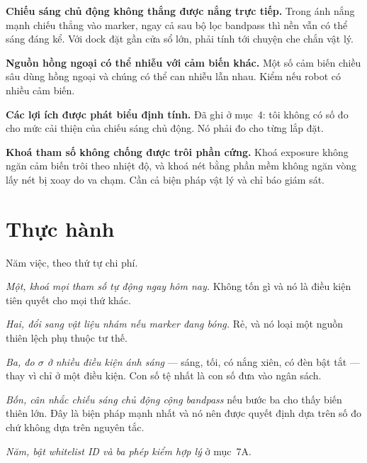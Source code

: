 \documentclass[../../marker.tex]{subfiles}
\begin{document}
\textbf{Chiếu sáng chủ động không thắng được nắng trực tiếp.} Trong ánh nắng mạnh chiếu thẳng vào marker, ngay cả sau bộ lọc bandpass thì nền vẫn có thể sáng đáng kể. Với dock đặt gần cửa sổ lớn, phải tính tới chuyện che chắn vật lý.

\textbf{Nguồn hồng ngoại có thể nhiễu với cảm biến khác.} Một số cảm biến chiều sâu dùng hồng ngoại và chúng có thể can nhiễu lẫn nhau. Kiểm nếu robot có nhiều cảm biến.

\textbf{Các lợi ích được phát biểu định tính.} Đã ghi ở mục~4: tôi không có số đo cho mức cải thiện của chiếu sáng chủ động. Nó phải đo cho từng lắp đặt.

\textbf{Khoá tham số không chống được trôi phần cứng.} Khoá exposure không ngăn cảm biến trôi theo nhiệt độ, và khoá nét bằng phần mềm không ngăn vòng lấy nét bị xoay do va chạm. Cần cả biện pháp vật lý và chỉ báo giám sát.

\section{Thực hành}

Năm việc, theo thứ tự chi phí.

\emph{Một, khoá mọi tham số tự động ngay hôm nay.} Không tốn gì và nó là điều kiện tiên quyết cho mọi thứ khác.

\emph{Hai, đổi sang vật liệu nhám nếu marker đang bóng.} Rẻ, và nó loại một nguồn thiên lệch phụ thuộc tư thế.

\emph{Ba, đo \(\sigma\) ở nhiều điều kiện ánh sáng} --- sáng, tối, có nắng xiên, có đèn bật tắt --- thay vì chỉ ở một điều kiện. Con số tệ nhất là con số đưa vào ngân sách.

\emph{Bốn, cân nhắc chiếu sáng chủ động cộng bandpass} nếu bước ba cho thấy biến thiên lớn. Đây là biện pháp mạnh nhất và nó nên được quyết định dựa trên số đo chứ không dựa trên nguyên tắc.

\emph{Năm, bật whitelist ID và ba phép kiểm hợp lý} ở mục~7A.
\end{document}
